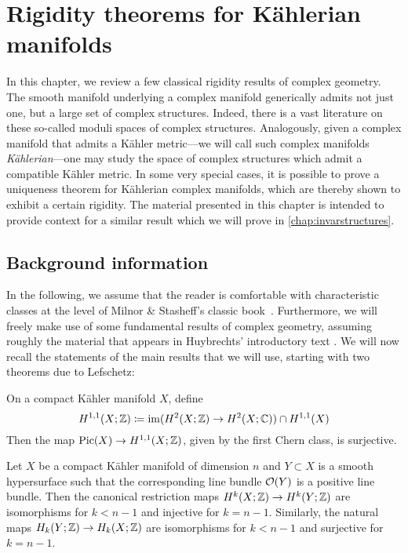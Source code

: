 \chapter{Rigidity theorems for K\"ahlerian manifolds}
\label{chap:uniqueness}

In this chapter, we review a few classical rigidity results of complex geometry. The smooth manifold underlying a complex manifold generically admits not just one, but a large set of complex structures. Indeed, there is a vast literature on these so-called moduli spaces of complex structures. Analogously, given a complex manifold that admits a K\"ahler metric---we will call such complex manifolds \emph{K\"ahlerian}---one may study the space of complex structures which admit a compatible K\"ahler metric. In some very special cases, it is possible to prove a uniqueness theorem for K\"ahlerian complex manifolds, which are thereby shown to exhibit a certain rigidity. The material presented in this chapter is intended to provide context for a similar result which we will prove in \cref{chap:invarstructures}.

\section{Background information}

In the following, we assume that the reader is comfortable with characteristic classes at the level of Milnor \& Stasheff's classic book~\cite{MS1974}. Furthermore, we will freely make use of some fundamental results of complex geometry, assuming roughly the material that appears in Huybrechts' introductory text \cite{Huy2005}. We will now recall the statements of the main results that we will use, starting with two theorems due to Lefschetz:

\begin{thm}
	On a compact K\"ahler manifold $X$, define
	\begin{equation*}
		H^{1,1}(X;\mathbb{Z})\coloneqq \operatorname{im}(H^2(X;\mathbb{Z})\to H^2(X;\mathbb{C}))\cap H^{1,1}(X)
	\end{equation*} 
	Then the map $\operatorname{Pic}(X)\to H^{1,1}(X;\mathbb{Z})$, given by the first Chern class, is surjective.
\end{thm}

\begin{thm}
	Let $X$ be a compact K\"ahler manifold of dimension $n$ and $Y\subset X$ is a smooth hypersurface such that the corresponding line bundle $\mathcal{O}(Y)$ is a positive line bundle. Then the canonical restriction maps $H^k(X;\mathbb{Z})\to H^k(Y;\mathbb{Z})$ are isomorphisms for $k<n-1$ and injective for $k=n-1$. Similarly, the natural maps $H_k(Y;\mathbb{Z})\to H_k(X;\mathbb{Z})$ are isomorphisms for $k<n-1$ and surjective for $k=n-1$.
\end{thm}


